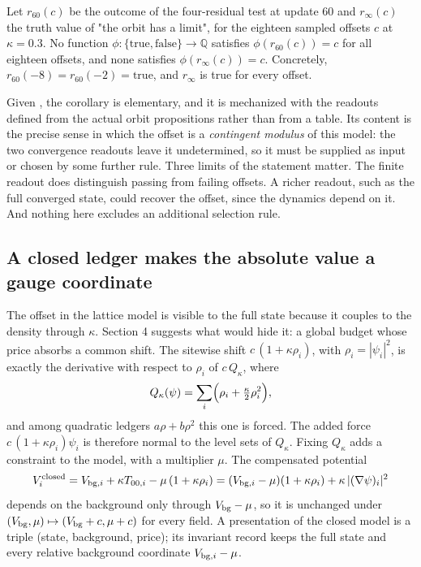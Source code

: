 \begin{corollary}\label{thm:readout}
Let $r_{60}(c)$ be the outcome of the four-residual test at update 60 and $r_\infty(c)$ the truth value of
"the orbit has a limit", for the eighteen sampled offsets $c$ at $\kappa=0.3$. No function
$\phi:\{\mathrm{true},\mathrm{false}\}\to\mathbb Q$ satisfies $\phi(r_{60}(c))=c$ for all eighteen offsets, and none satisfies
$\phi(r_\infty(c))=c$. Concretely, $r_{60}(-8)=r_{60}(-2)=\mathrm{true}$, and $r_\infty$ is true for every offset.
\end{corollary}

Given , the corollary is elementary, and it is
mechanized with the readouts defined from the actual orbit propositions
rather than from a table. Its content is the precise sense in which the
offset is a \emph{contingent modulus} of this model: the two convergence
readouts leave it undetermined, so it must be supplied as input or
chosen by some further rule. Three limits of the statement matter. The
finite readout does distinguish passing from failing offsets. A richer
readout, such as the full converged state, could recover the offset,
since the dynamics depend on it. And nothing here excludes an additional
selection rule.

\hypertarget{a-closed-ledger-makes-the-absolute-value-a-gauge-coordinate}{%
\subsection{A closed ledger makes the absolute value a gauge
coordinate}\label{a-closed-ledger-makes-the-absolute-value-a-gauge-coordinate}}

The offset in the lattice model is visible to the full state because it
couples to the density through \(\kappa\). Section 4 suggests what would
hide it: a global budget whose price absorbs a common shift. The
sitewise shift \(c\,(1+\kappa\rho_i)\), with \(\rho_i=|\psi_i|^2\), is
exactly the derivative with respect to \(\rho_i\) of \(c\,Q_\kappa\),
where
\[Q_\kappa(\psi)=\sum_i\Bigl(\rho_i+\tfrac{\kappa}{2}\rho_i^2\Bigr),\]
and among quadratic ledgers \(a\rho+b\rho^2\) this one is forced. The
added force \(c\,(1+\kappa\rho_i)\psi_i\) is therefore normal to the
level sets of \(Q_\kappa\). Fixing \(Q_\kappa\) adds a constraint to the
model, with a multiplier \(\mu\). The compensated potential
\[V_i^{\rm closed}=V_{{\rm bg},i}+\kappa T_{00,i}-\mu\,(1+\kappa\rho_i)=(V_{{\rm bg},i}-\mu)(1+\kappa\rho_i)+\kappa\,|(\nabla\psi)_i|^2\]
depends on the background only through \(V_{\rm bg}-\mu\), so it is
unchanged under \((V_{\rm bg},\mu)\mapsto(V_{\rm bg}+c,\mu+c)\) for
every field. A presentation of the closed model is a triple (state,
background, price); its invariant record keeps the full state and every
relative background coordinate \(V_{{\rm bg},i}-\mu\).

